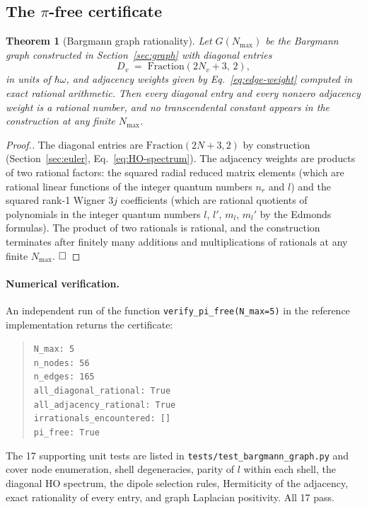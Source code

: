 \documentclass[twocolumn,pra,amsmath,amssymb,superscriptaddress]{revtex4-2}
\newtheorem{theorem}{Theorem}
\begin{document}
\subsection{The $\pi$-free certificate}
\label{sec:pi-free}

\begin{theorem}[Bargmann graph rationality]
\label{thm:pi-free}
Let $G(N_{\max})$ be the Bargmann graph constructed in
Section~\ref{sec:graph} with diagonal entries
\begin{equation}
  D_v
  \;=\;
  \mathrm{Fraction}\!\left( 2 N_v + 3,\, 2 \right),
\end{equation}
in units of $\hbar\omega$, and adjacency weights given by
Eq.~\eqref{eq:edge-weight} computed in exact rational arithmetic.
Then every diagonal entry and every nonzero adjacency weight is a
rational number, and no transcendental constant appears in the
construction at any finite $N_{\max}$.
\end{theorem}

\begin{proof}[Proof.]
The diagonal entries are $\mathrm{Fraction}(2 N + 3, 2)$ by
construction (Section~\ref{sec:euler}, Eq.~\eqref{eq:HO-spectrum}).
The adjacency weights are products of two rational factors:
the squared radial reduced matrix elements (which are rational
linear functions of the integer quantum numbers $n_r$ and $l$) and
the squared rank-1 Wigner $3j$ coefficients (which are rational
quotients of polynomials in the integer quantum numbers $l$, $l'$,
$m_l$, $m_l'$ by the Edmonds~\cite{edmonds} formulas).  The product
of two rationals is rational, and the construction terminates after
finitely many additions and multiplications of rationals at any
finite $N_{\max}$.  $\hfill\square$
\end{proof}

\paragraph{Numerical verification.}
An independent run of the function
\texttt{verify\_pi\_free(N\_max=5)} in the reference
implementation returns the certificate:
\begin{quote}\small
\texttt{N\_max: 5}\\
\texttt{n\_nodes: 56}\\
\texttt{n\_edges: 165}\\
\texttt{all\_diagonal\_rational: True}\\
\texttt{all\_adjacency\_rational: True}\\
\texttt{irrationals\_encountered: []}\\
\texttt{pi\_free: True}
\end{quote}
The 17 supporting unit tests are listed in
\texttt{tests/test\_bargmann\_graph.py} and cover node enumeration,
shell degeneracies, parity of $l$ within each shell, the diagonal
HO spectrum, the dipole selection rules, Hermiticity of the
adjacency, exact rationality of every entry, and graph Laplacian
positivity.  All 17 pass.
\end{document}
